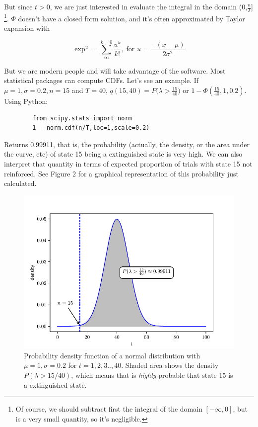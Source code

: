 \documentclass[11pt]{article}
\begin{document}
But since $t > 0$, we are just interested in evaluate the integral in the domain (0,$\frac{n}{T}$] \footnote{Of course,
    we should subtract first the integral of the domain $[-\infty, 0]$, but is a very small quantity, so it's negligible.}.
$\Phi$ doesn't have a closed form solution, and it's often approximated by Taylor expansion with

    \[
        \exp^{u} = \sum^{k=0}_{\infty} \frac{u^k}{k!}, \; \text{for } u = \frac{-(x - \mu)}{2 \sigma^2}
    \]

But we are modern people and will take advantage of the software.
Most statistical packages can compute CDFs.
Let's see an example.
If $\mu = 1, \sigma = 0.2, n = 15$
and $T = 40$, $q(15,40) = P \Big( \lambda > \frac{15}{40} \Big)$ or $1 - \Phi(\frac{15}{40},1,0.2)$. Using \textsf{Python}:

    \begin{verbatim}
        from scipy.stats import norm
        1 - norm.cdf(n/T,loc=1,scale=0.2)
    \end{verbatim}

Returns 0.99911, that is, the probability (actually, the density, or the area under the curve, etc) of state 15 being a
    extinguished state is very high.
    We can also interpret that quantity in terms of expected proportion of trials with state
    15 not reinforced.
    See Figure 2 for a graphical representation of this probability just calculated.

    \begin{figure}[H]
        \centering
        \includegraphics[scale=0.65]{lambda_nT}
        \caption{Probability density function of a normal distribution with $\mu = 1, \sigma = 0.2$ for $t = 1,2,3..,40$.
        Shaded area shows the density $P(\lambda > 15/40)$, which means that is \textit{highly} probable that state 15
        is a extinguished state.}
    \end{figure}
\end{document}
